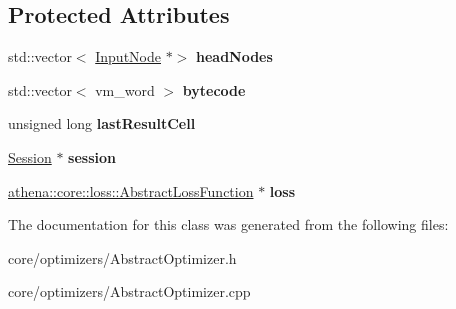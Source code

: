 \subsection*{Protected Attributes}
\begin{DoxyCompactItemize}
\item 
\mbox{\label{classathena_1_1core_1_1optimizers_1_1_abstract_optimizer_a531c36dd399081caeacfc8974805de79}} 
std\+::vector$<$ \mbox{\hyperlink{classathena_1_1core_1_1_input_node}{Input\+Node}} $\ast$$>$ {\bfseries head\+Nodes}
\item 
\mbox{\label{classathena_1_1core_1_1optimizers_1_1_abstract_optimizer_ad96008b4e5dec5e9bf5ece0cf4fdcba6}} 
std\+::vector$<$ vm\+\_\+word $>$ {\bfseries bytecode}
\item 
\mbox{\label{classathena_1_1core_1_1optimizers_1_1_abstract_optimizer_abd29bf7d7d1f9f553756b918f526e2fc}} 
unsigned long {\bfseries last\+Result\+Cell}
\item 
\mbox{\label{classathena_1_1core_1_1optimizers_1_1_abstract_optimizer_a7cc6da9a5944cf7eba19dc04814e478b}} 
\mbox{\hyperlink{classathena_1_1core_1_1_session}{Session}} $\ast$ {\bfseries session}
\item 
\mbox{\label{classathena_1_1core_1_1optimizers_1_1_abstract_optimizer_a9043b6609054109d6f590477bd62c975}} 
\mbox{\hyperlink{classathena_1_1core_1_1loss_1_1_abstract_loss_function}{athena\+::core\+::loss\+::\+Abstract\+Loss\+Function}} $\ast$ {\bfseries loss}
\end{DoxyCompactItemize}


The documentation for this class was generated from the following files\+:\begin{DoxyCompactItemize}
\item 
core/optimizers/Abstract\+Optimizer.\+h\item 
core/optimizers/Abstract\+Optimizer.\+cpp\end{DoxyCompactItemize}
